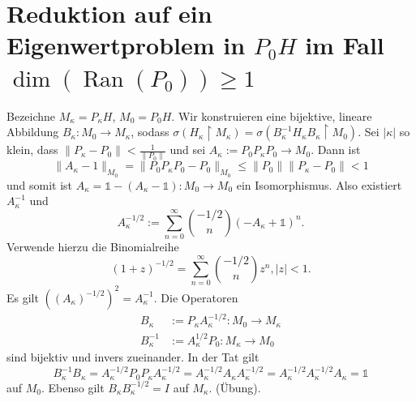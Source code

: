\documentclass{mycourse}
\newcommand{\Ran}{\operatorname{Ran}}
\begin{document}
\section{Reduktion auf ein Eigenwertproblem in $P_0H$ im Fall $\dim(\Ran(P_0))\ge 1$}
Bezeichne $M_\kappa=P_\kappa H$, $M_0= P_0H$. Wir konstruieren eine bijektive, lineare Abbildung $B_\kappa: M_0 \to M_\kappa$, sodass $\sigma(H_\kappa \upharpoonright M_\kappa) = \sigma( B_\kappa^{-1} H_\kappa B_\kappa \upharpoonright M_0)$. Sei $|\kappa|$ so  klein, dass $\| P_\kappa - P_0\|< \frac{1}{\| P_0\|}$ und sei $A_\kappa:= P_0 P_\kappa P_0 \to M_0$. Dann ist
\[
\|A_\kappa -1 \|_{M_0} = \| P_0 P_\kappa P_0- P_0\|_{M_0} \le \| P_0\| \| P_\kappa - P_0\| < 1
\]
und somit ist $A_\kappa = \mathbb 1 - (A_\kappa -\mathbb 1) : M_0 \to M_0$ ein Isomorphismus. Also existiert $A_\kappa^{-1}$ und 
\[
A_\kappa^{-1/2} := \sum_{n=0}^\infty \binom{-1/2}{n} (-A_\kappa + \mathbb 1)^n.
\]
Verwende hierzu die Binomialreihe 
\[
(1+z)^{-1/2} = \sum_{n=0}^\infty \binom{-1/2}{n} z^n, |z| < 1.
\]
Es gilt $((A_\kappa)^{-1/2})^2 = A_\kappa^{-1}$. Die Operatoren
\begin{align*}
B_\kappa &:= P_\kappa A_\kappa^{-1/2} : M_0 \to M_\kappa\\
B_\kappa^{-1} &:= A_\kappa^{1/2} P_0 : M_\kappa \to M_0
\end{align*}
sind bijektiv und invers zueinander. In der Tat gilt
\[
B_\kappa^{-1} B_\kappa = A_\kappa^{-1/2} P_0 P_\kappa A_\kappa^{-1/2} = A_\kappa^{-1/2} A_\kappa A_\kappa^{-1/2} = A_\kappa^{-1/2} A_\kappa^{-1/2} A_\kappa = \mathbb 1
\]
auf $M_0$. Ebenso gilt $B_\kappa B_\kappa^{-1/2}=I$ auf $M_\kappa$. (Übung).

\fixme[Bild ähnlich wie im Kapitel zur Störungstheorie, vgl. Seite 57 aus dem Vorlesungsskript für $P_\kappa^*= P_\kappa$, $\kappa\in \mathbb R$]
\end{document}
